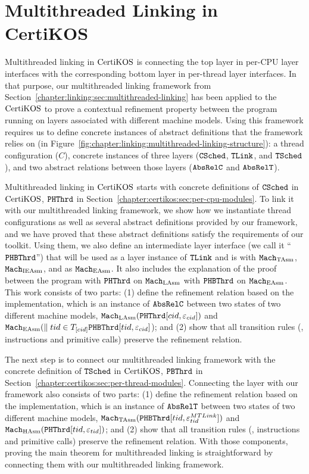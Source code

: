 \section{Multithreaded Linking in CertiKOS}
\label{chapter:certikos:sec:multithreaded-linking-for-certikos}


Multithreaded linking in $\mathrm{CertiKOS}$ is connecting the top layer in  per-CPU layer interfaces with
the corresponding bottom layer in  per-thread layer interfaces. 
In that purpose, our multithreaded linking framework from Section~\ref{chapter:linking:sec:multithreaded-linking} 
has been applied to the $\mathrm{CertiKOS}$ to prove a contextual refinement property between the program running on  layers associated with different machine models.
Using this framework requires us to define concrete instances 
of  abstract definitions that the framework relies on (in Figure~\ref{fig:chapter:linking:multithreaded-linking-structure}):
a thread configuration ($C$), concrete instances of three layers (${{\mathrm{\texttt{CSched}}}}$, ${{\mathrm{\texttt{TLink}}}}$, and ${{\mathrm{\texttt{TSched}}}}$), 
and  two abstract relations between those layers (${{\mathrm{\texttt{AbsRelC}}}}$ and ${{\mathrm{\texttt{AbsRelT}}}}$). 

Multithreaded linking in $\mathrm{CertiKOS}$  starts with concrete definitions of ${{\mathrm{\texttt{CSched}}}}$ in $\mathrm{CertiKOS}$, ${{\mathrm{\texttt{PHThrd}}}}$ in Section~\ref{chapter:certikos:sec:per-cpu-modules}.
To link it with our multithreaded linking framework,
we show how we instantiate thread configurations as well as several abstract definitions provided by our framework, and we have proved that these abstract definitions satisfy the requirements of our toolkit.
Using them, we also define an intermediate layer interface (we call it ``${{\mathrm{\texttt{PHBThrd}}}}$'') that will be used as a layer instance of ${{\mathrm{\texttt{TLink}}}}$ and is with ${\mathrm{\texttt{Mach}}}_{\mathrm{TAsm}}$, ${\mathrm{\texttt{Mach}}}_{\mathrm{IEAsm}}$, and as ${\mathrm{\texttt{Mach}}}_{\mathrm{EAsm}}$.
It also includes  the explanation of the proof between the program with  ${{\mathrm{\texttt{PHThrd}}}}$ on ${\mathrm{\texttt{Mach}}}_{\mathrm{LAsm}}$ 
with ${{\mathrm{\texttt{PHBThrd}}}}$ on ${\mathrm{\texttt{Mach}}}_{\mathrm{EAsm}}$. 
This work consists of two parts:  (1) define the refinement relation based on the implementation, which is an instance of ${{\mathrm{\texttt{AbsRelC}}}}$ between two states of two different machine models,
${\mathrm{\texttt{Mach}}}_{\mathrm{LAsm}}({{\mathrm{\texttt{PHThrd}}}}[cid, {\varepsilon}_{cid}])$ and 
${\mathrm{\texttt{Mach}}}_{\mathrm{EAsm}}(\parallel tid \in T_{[cid]} {{\mathrm{\texttt{PHBThrd}}}}[tid, {\varepsilon}_{cid}]$); and 
(2) show that all transition rules (\ie, instructions and primitive calls) preserve the refinement relation. 

The next step is to connect our multithreaded linking framework with the concrete definition of  ${{\mathrm{\texttt{TSched}}}}$ in $\mathrm{CertiKOS}$, ${{\mathrm{\texttt{PBThrd}}}}$ in Section~\ref{chapter:certikos:sec:per-thread-modules}.
Connecting the layer with our framework also consists of two parts:  (1) define the refinement relation based on the implementation, which is an instance of ${{\mathrm{\texttt{AbsRelT}}}}$ between two states of two different machine models,
${\mathrm{\texttt{Mach}}}_{\mathrm{TAsm}}({{\mathrm{\texttt{PHBThrd}}}}[tid, {\varepsilon}^{MTLink}_{tid}])$ and 
${\mathrm{\texttt{Mach}}}_{\mathrm{HAsm}}({{\mathrm{\texttt{PHThrd}}}}[tid, {\varepsilon}_{tid}])$; and 
(2) show that all transition rules (\ie, instructions and primitive calls) preserve the refinement relation. 
With those components, proving the main theorem for multithreaded linking is straightforward by connecting 
them with our multithreaded linking framework.


